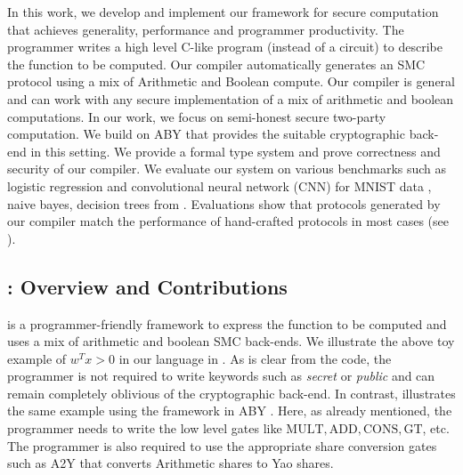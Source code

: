 In this work, we develop and implement our framework \tool for secure computation that achieves generality, performance and programmer productivity. The programmer writes a high level C-like program (instead of a circuit) to describe the function to be computed. Our compiler automatically generates an SMC protocol using a mix of Arithmetic and Boolean compute. Our compiler is general and can work with any secure implementation of a mix of arithmetic and boolean computations. In our work, we focus on semi-honest secure two-party computation. We build on ABY \cite{aby} that provides the suitable cryptographic back-end in this setting. We provide a formal type system and prove correctness and security of our compiler. We evaluate our system on various benchmarks such as logistic regression and convolutional neural network (CNN) for MNIST data \cite{minionn}, naive bayes, decision trees from \cite{shafindss}. Evaluations show that protocols generated by our compiler match the performance of hand-crafted protocols in most cases (see ). 


\subsection{\tool: Overview and Contributions} 
\label{sec:contrib}

\tool is a programmer-friendly framework to express the function to be computed and uses a mix of arithmetic and boolean SMC back-ends. We illustrate the above toy example of $w^Tx >0$ in our language in . As is clear from the code, the programmer is not required to write keywords such as {\em secret} or {\em public} and can remain completely oblivious of the cryptographic back-end. In contrast,  illustrates the same example using the framework in ABY \cite{aby}. Here, as already mentioned, the programmer needs to write the low level gates like $\mathrm{MULT, ADD, CONS, GT}$, etc. The programmer is also required to use the appropriate share conversion gates such as A2Y that converts Arithmetic shares to Yao shares. 

